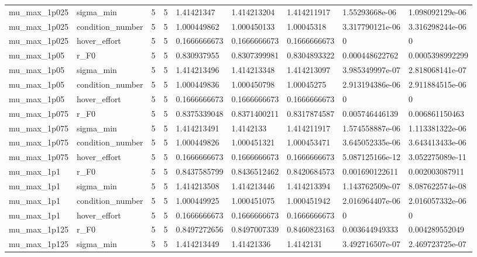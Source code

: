 \begin{tabular}{@{}lllllllll@{}}
mu\_max\_1p025 & sigma\_min & 5 & 5 & 1.41421347 & 1.414213204 & 1.414211917 & 1.55293668e-06 & 1.098092129e-06 \\
mu\_max\_1p025 & condition\_number & 5 & 5 & 1.000449862 & 1.000450133 & 1.00045318 & 3.317790121e-06 & 3.316298244e-06 \\
mu\_max\_1p025 & hover\_effort & 5 & 5 & 0.1666666673 & 0.1666666673 & 0.1666666673 & 0 & 0 \\
mu\_max\_1p05 & r\_F0 & 5 & 5 & 0.830937955 & 0.8307399981 & 0.8304893322 & 0.000448622762 & 0.0005398992299 \\
mu\_max\_1p05 & sigma\_min & 5 & 5 & 1.414213496 & 1.414213348 & 1.414213097 & 3.985349997e-07 & 2.818068141e-07 \\
mu\_max\_1p05 & condition\_number & 5 & 5 & 1.000449836 & 1.000450798 & 1.00045275 & 2.913194386e-06 & 2.911884515e-06 \\
mu\_max\_1p05 & hover\_effort & 5 & 5 & 0.1666666673 & 0.1666666673 & 0.1666666673 & 0 & 0 \\
mu\_max\_1p075 & r\_F0 & 5 & 5 & 0.8375339048 & 0.8371400211 & 0.8317874587 & 0.005746446139 & 0.006861150463 \\
mu\_max\_1p075 & sigma\_min & 5 & 5 & 1.414213491 & 1.4142133 & 1.414211917 & 1.574558887e-06 & 1.113381322e-06 \\
mu\_max\_1p075 & condition\_number & 5 & 5 & 1.000449826 & 1.000451321 & 1.000453471 & 3.645052335e-06 & 3.643413433e-06 \\
mu\_max\_1p075 & hover\_effort & 5 & 5 & 0.1666666673 & 0.1666666673 & 0.1666666673 & 5.087125166e-12 & 3.052275089e-11 \\
mu\_max\_1p1 & r\_F0 & 5 & 5 & 0.8437585799 & 0.8436512462 & 0.8420684573 & 0.001690122611 & 0.002003087911 \\
mu\_max\_1p1 & sigma\_min & 5 & 5 & 1.414213508 & 1.414213446 & 1.414213394 & 1.143762509e-07 & 8.087622574e-08 \\
mu\_max\_1p1 & condition\_number & 5 & 5 & 1.000449925 & 1.000451075 & 1.000451942 & 2.016964407e-06 & 2.016057332e-06 \\
mu\_max\_1p1 & hover\_effort & 5 & 5 & 0.1666666673 & 0.1666666673 & 0.1666666673 & 0 & 0 \\
mu\_max\_1p125 & r\_F0 & 5 & 5 & 0.8497272656 & 0.8497007339 & 0.8460823163 & 0.003644949333 & 0.004289552049 \\
mu\_max\_1p125 & sigma\_min & 5 & 5 & 1.414213449 & 1.41421336 & 1.4142131 & 3.492716507e-07 & 2.469723725e-07 \\

\end{tabular}
